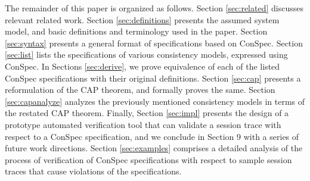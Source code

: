 \documentclass[journal,compsoc]{IEEEtran}
\begin{document}
The remainder of this paper is organized as follows. Section \ref{sec:related} discusses relevant related work. Section  \ref{sec:definitions} presents the assumed system model, and basic definitions and terminology used in the paper.  Section \ref{sec:syntax} presents a general format of specifications based on ConSpec. Section \ref{sec:list} lists the specifications of various  consistency models, expressed using ConSpec.  In Sections \ref{sec:derive}, we prove equivalence of each of the listed ConSpec specifications with their original definitions. Section \ref{sec:cap} presents a reformulation of the CAP theorem, and formally proves the same.  Section \ref{sec:capanalyze} analyzes the previously mentioned consistency models in terms of the restated CAP theorem.  
 Finally, Section \ref{sec:impl} presents the design of a prototype automated verification tool that can validate a session trace with respect to a ConSpec specification, and we conclude in Section 9 with a series of future work directions.  %
 Section  \ref{sec:examples}  comprises a detailed analysis of the process of verification of ConSpec specifications with respect to sample session traces that cause violations of the specifications. 
 
\end{document}
